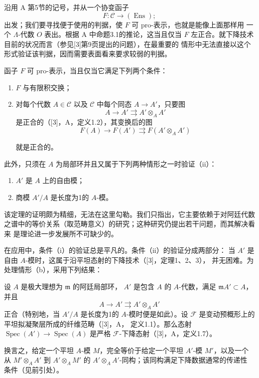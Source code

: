 
沿用 A 第5节的记号，并从一个协变函子
\[
  F:\mathcal C\longrightarrow(\operatorname{Ens}) ;
\]
出发；我们要寻找便于使用的判据，使 $F$ 可 pro-表示，也就是能像上面那样用
一个 $\Lambda$-代数 $O$ 表出。根据 A 中命题3.1的推论，这当且仅当 $F$
左正合。就下降技术目前的状况而言（参见[3]第9页提出的问题），在最重要的
情形中无法直接以这个形式验证该判据，因而需要表面看来要求较弱的判据。

 函子 $F$ 可 pro-表示，当且仅当它满足下列两个条件：
\begin{enumerate}
\item[(i)] $F$ 与有限积交换；
\item[(ii)] 对每个代数 $A\in\mathcal C$ 以及 $\mathcal C$ 中每个同态
$A\longrightarrow A'$，只要图
\[
  A\longrightarrow A'\rightrightarrows A'\otimes_A A'
\]
是正合的（[3]，A，定义1.2），其变换后的图
\[
  F(A)\longrightarrow F(A')\rightrightarrows F(A'\otimes_A A')
\]

就是正合的。
\end{enumerate}
此外，只须在 $A$ 为局部环并且又属于下列两种情形之一时验证（ii）：
\begin{enumerate}
\item[(a)] $A'$ 是 $A$ 上的自由模；
\item[(b)] 商模 $A'/A$ 是长度为1的 $A$-模。
\end{enumerate}

该定理的证明颇为精细，无法在这里勾勒。我们只指出，它主要依赖于对阿廷代数
之谱中的等价关系（取范畴意义）的研究；这种研究仍提出若干问题，而其解决看来
是理论进一步发展所不可缺少的。

在应用中，条件（i）的验证总是平凡的。条件（ii）的验证分成两部分：
当 $A'$ 是自由 $A$-模时，这属于沿平坦态射的下降技术（[3]，定理1、2、3），
并无困难。为处理情形（b），采用下列结果：

 设 $A$ 是极大理想为 $\mathfrak m$ 的阿廷局部环，
$A'$ 是包含 $A$ 的 $A$-代数，满足 $\mathfrak mA'\subset A$，并且
\[
  A\longrightarrow A'\rightrightarrows A'\otimes_A A'
\]
正合（特别地，当 $A'/A$ 是长度为1的 $A$-模时便是如此）。设
$\mathcal F$ 是变动预概形上的平坦拟凝聚层所成的纤维范畴（[3]，A，
定义1.1）。那么态射
$\operatorname{Spec}(A')\longrightarrow\operatorname{Spec}(A)$ 是严格
$\mathcal F$-下降态射（[3]，A，定义1.7）。

换言之，给定一个平坦 $A$-模 $M$，完全等价于给定一个平坦
$A'$-模 $M'$，以及一个从 $M'\otimes_AA'$ 到
$A'\otimes_AM'$ 的 $A'\otimes_AA'$-同构；该同构满足下降数据通常的传递性
条件（见前引处）。

